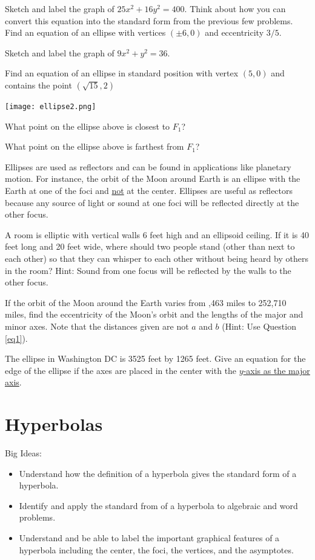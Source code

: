 \bq Sketch and label the graph of $25x^2+16y^2=400$. Think about how you can convert this equation into the standard form from the previous few problems.
\eq
\bq Find an equation of an ellipse with vertices $(\pm 6,0)$ and eccentricity $3/5$. \eq

\bq Sketch and label the graph of $9x^2+y^2=36$. \eq

\bq Find an equation of an ellipse in standard position with vertex $(5,0)$ and contains the point $(\sqrt{15},2)$ \eq

\begin{center} \texttt{[image: ellipse2.png]} \end{center}
\bq\label{eq1}
\be
\item What point on the ellipse above is closest to $F_1$?
\item What point on the ellipse above is farthest from $F_1$?
\ee
\eq
\begin{info} Ellipses are used as reflectors and can be found in applications like planetary motion. For instance, the orbit of the Moon around Earth is an ellipse with the Earth at one of the foci and \underline{not} at the center. Ellipses are useful as reflectors because any source of light or sound at one foci will be reflected directly at the other focus. \end{info}

\bq A room is elliptic with vertical walls 6 feet high and an ellipsoid ceiling. If it is 40 feet long and 20 feet wide, where should two people stand (other than next to each other) so that they can whisper to each other without being heard by others in the room? Hint: Sound from one focus will be reflected by the walls to the other focus.
\eq

\bq If the orbit of the Moon around the Earth varies from ,463 miles to 252,710 miles, find the eccentricity of the Moon's orbit and the lengths of the major and minor axes. Note that the distances given are not $a$ and $b$ (Hint: Use Question \ref{eq1}).
\eq

\bq The ellipse in Washington DC is 3525 feet by 1265 feet. Give an equation for the edge of the ellipse if the axes are placed in the center with the \underline{$y$-axis as the major axis}. \eq

\section{Hyperbolas}
Big Ideas:
\begin{itemize}
\item Understand how the definition of a hyperbola gives the standard form of a hyperbola.
\item Identify and apply the standard from of a hyperbola to algebraic and word problems.
\item Understand and be able to label the important graphical features of a hyperbola including the center, the foci, the vertices, and the asymptotes.
\end{itemize}

